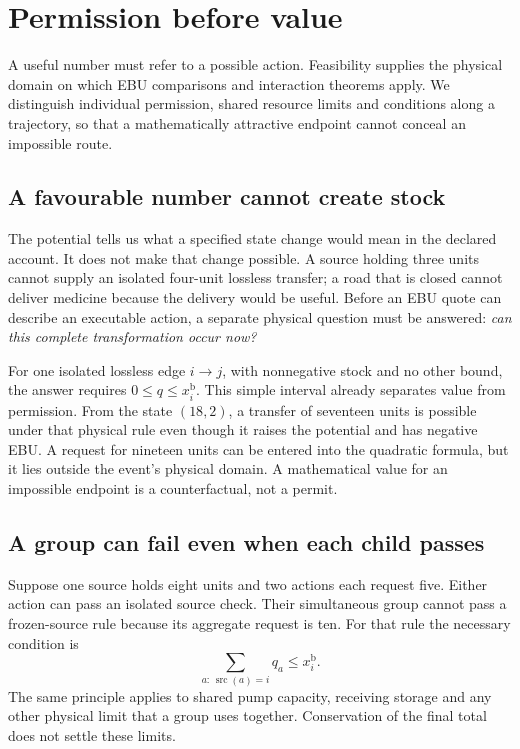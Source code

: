 \chapter{Permission before value}\label{ch:permission}

A useful number must refer to a possible action. Feasibility supplies the physical domain on which EBU comparisons and interaction theorems apply. We distinguish individual permission, shared resource limits and conditions along a trajectory, so that a mathematically attractive endpoint cannot conceal an impossible route.


\section{A favourable number cannot create stock}
The potential tells us what a specified state change would mean in the
declared account. It does not make that change possible. A source holding
three units cannot supply an isolated four-unit lossless transfer; a road
that is closed cannot deliver medicine because the delivery would be useful.
Before an EBU quote can describe an executable action, a separate physical
question must be answered: \emph{can this complete transformation occur now?}

For one isolated lossless edge $i\to j$, with nonnegative stock and no other
bound, the answer requires $0\leq q\leq x^{\mathrm{b}}_i$. This simple interval already
separates value from permission. From the state $(18,2)$, a transfer of
seventeen units is possible under that physical rule even though it raises
the potential and has negative EBU. A request for nineteen units can be
entered into the quadratic formula, but it lies outside the event's physical
domain. A mathematical value for an impossible endpoint is a counterfactual,
not a permit.

\section{A group can fail even when each child passes}
Suppose one source holds eight units and two actions each request five.
Either action can pass an isolated source check. Their simultaneous group
cannot pass a frozen-source rule because its aggregate request is ten. For
that rule the necessary condition is
\begin{equation}
 \sum_{a:\,\operatorname{src}(a)=i}q_a\leq x^{\mathrm{b}}_i.
\end{equation}
The same principle applies to shared pump capacity, receiving storage and
any other physical limit that a group uses together. Conservation of the
final total does not settle these limits.

